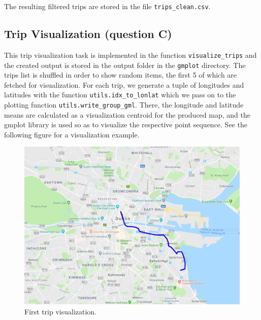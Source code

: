 \documentclass[12pt]{article}
\begin{document}
	The resulting filtered trips are stored in the file \texttt{trips\_clean.csv}.
	
	\subsection{Trip Visualization (question C)}
	This trip visualization task is implemented in the function
  \texttt{visualize\_trips} and the created output is stored in the output
  folder in the \texttt{gmplot} directory. The trips list is shuffled in order
  to show random items, the first 5 of which are fetched for
  visualization. For each trip, we generate a tuple of longitudes and latitudes
  with the function \texttt{utils.idx\_to\_lonlat} which we pass on to the
  plotting function \texttt{utils.write\_group\_gml}. There, the longitude and
  latitude means are calculated as a visualization centroid for the produced map, and the gmplot
  library is used so as to visualize the respective point sequence. See the
  following figure for a visualization example. 
	
	\begin{figure} [H]
		\begin{center}
			\includegraphics [scale = 0.55] {questionC1.png}
			\caption{First trip visualization.}
		\end{center}
    \label{gmlplot_example}
	\end{figure}
\end{document}
